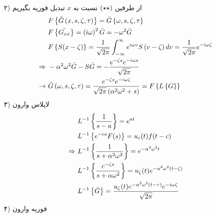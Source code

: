 ۲) از طرفین
$\left(\star\star\right)$
نسبت به
$x$
تبدیل فوریه بگیریم
\begin{equation*}
	\begin{aligned}
		&\
		F\left\{\tilde{G}\left(x,s,\zeta,\tau\right)\right\}=\bar{G}\left\{\omega,s,\zeta,\tau\right\}
		\\ &\
		F\left\{\tilde{G_{xx}}\right\}=\left(i\omega\right)^2\bar{G}=-\omega^2\bar{G}
		\\ &\
		F\left\{S(x-\zeta)\right\}=\frac1{\sqrt{2\pi}}\int_{-\infty}^\infty e^{i\omega v}S\left(v-\zeta\right)dv=\frac1{\sqrt{2\pi}}e^{-i\omega\zeta}
		\\ \Rightarrow &\
		-\alpha^2\omega^2\bar{G}-S\bar{G}=-\frac{e^{-\zeta s}e^{-i\omega s}}{\sqrt{2\pi}}
		\\ \rightarrow &\
		\bar{G}\left(\omega,s,\zeta,\tau\right)=\frac{e^{-\zeta s}e^{-i\omega\zeta}}{\sqrt{2\pi}\left(\alpha^2\omega^2+s\right)}=F\left\{L\left\{G\right\}\right\}
	\end{aligned}
\end{equation*}
۳) لاپلاس وارون
\begin{equation*}
	\begin{aligned}
		&\
		L^{-1}\left\{\frac1{s-a}\right\}=e^{at}
		\\ &\
		L^{-1}\left\{e^{-cs}F(s)\right\}=u_c(t)f(t-c)
		\\ \Rightarrow &\
		L^{-1}\left\{\frac1{s+\alpha^2\omega^2}\right\}=e^{-\alpha^2\omega^2t}
		\\ &\
		L^{-1}\left\{\frac{e^{-\zeta s}}{s+\alpha\omega^2}\right\}=u_{\zeta}(t)e^{-\alpha^2\omega^2\left(t-\zeta\right)}
		\\ &\
		L^{-1}\left\{\bar{G}\right\}=\frac{u_{\zeta}(t)e^{-\alpha^2\omega^2\left(t-\tau\right)}e^{-i\omega\zeta}}{\sqrt{2\pi}}
	\end{aligned}
\end{equation*}
۴) فوریه وارون
